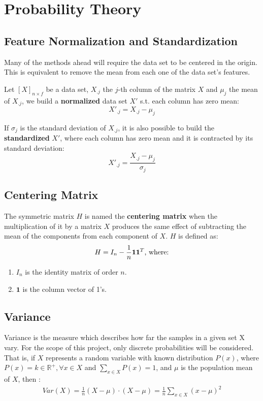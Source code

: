 \section{Probability Theory}
\subsection{Feature Normalization and Standardization}
Many of the methods ahead will require the data set to be centered in the origin. This is equivalent to remove the mean from each one of the data set's features.

Let $[X]_{n \times f}$ be a data set, $X_{.j}$ the $j$-th column of the matrix $X$ and $\mu_j$ the mean of $X_{.j}$, we build a \textbf{normalized} data set $X'$ s.t. each column has zero mean:
$$X'_{.j} = X_{.j} - \mu_j$$

If $\sigma_j$ is the standard deviation of $X_{.j}$, it is also possible to build the \textbf{standardized} $X'$, where each column has zero mean and it is contracted by its standard deviation:
$$X'_{.j} = \frac{X_{.j} - \mu_j}{\sigma_j}$$

\subsection{Centering Matrix}
The symmetric matrix $H$ is named the \textbf{centering matrix} when the multiplication of it by a matrix $X$ produces the same effect of subtracting the mean of the components from each component of $X$. $H$ is defined as:
$$
H = I_n - \frac{1}{n}\textbf{11}^T \textnormal{, where:}
$$
\begin{enumerate}
	\item $I_n$ is the identity matrix of order $n$.
	\item $\textbf{1}$ is the column vector of 1's.
\end{enumerate}

\subsection{Variance}
Variance is the measure which describes how far the samples in a given set X vary. For the scope of this project, only discrete probabilities will be considered. That is, if $X$ represents a random variable with known distribution $P(x)$, where $P(x) = k \in \mathbb{R}^{+}, \forall x \in X$ and $\sum_{x \in X} P(x) = 1$, and $\mu$ is the population mean of $X$, then \cite{ross2010introductory}:
\begin{align*}
	Var(X) = \frac{1}{n} (X-\mu) \cdot (X-\mu) = \frac{1}{n} \sum_{x \in X} (x - \mu)^2
\end{align*}

